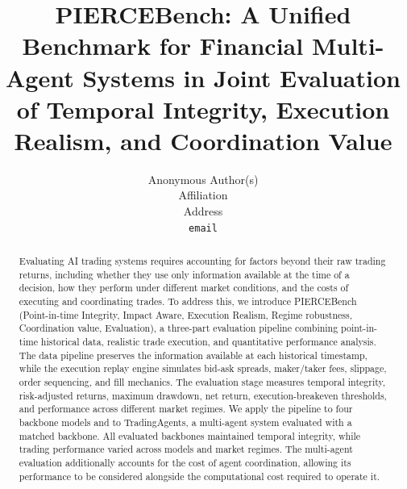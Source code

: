 \documentclass{article}
\title{PIERCEBench: A Unified Benchmark for Financial Multi-Agent Systems in Joint Evaluation of Temporal Integrity, Execution Realism, and Coordination Value}
\author{%
  Anonymous Author(s) \\
  Affiliation \\
  Address \\
  \texttt{email} \\
}
\begin{document}
\maketitle
\begin{abstract}
Evaluating AI trading systems requires accounting for factors beyond their raw trading returns, including whether they use only information available at the time of a decision, how they perform under different market conditions, and the costs of executing and coordinating trades. To address this, we introduce PIERCEBench (Point-in-time Integrity, Impact Aware, Execution Realism, Regime robustness, Coordination value, Evaluation), a three-part evaluation pipeline combining point-in-time historical data, realistic trade execution, and quantitative performance analysis. The data pipeline preserves the information available at each historical timestamp, while the execution replay engine simulates bid-ask spreads, maker/taker fees, slippage, order sequencing, and fill mechanics. The evaluation stage measures temporal integrity, risk-adjusted returns, maximum drawdown, net return, execution-breakeven thresholds, and performance across different market regimes. We apply the pipeline to four backbone models and to TradingAgents, a multi-agent system evaluated with a matched backbone. All evaluated backbones maintained temporal integrity, while trading performance varied across models and market regimes. The multi-agent evaluation additionally accounts for the cost of agent coordination, allowing its performance to be considered alongside the computational cost required to operate it.
\end{abstract}
\end{document}
